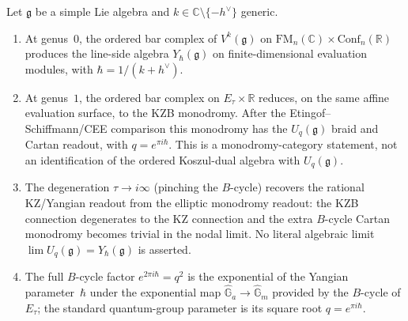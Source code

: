 \begin{theorem}
\ClaimStatusProvedHere
\label{thm:yangian-quantum-group}
Let $\mathfrak{g}$ be a simple Lie algebra and $k \in \mathbb{C}
\setminus \{-h^\vee\}$ generic.
\begin{enumerate}[label=\textup{(\roman*)}]
\item At genus~$0$, the ordered bar complex of $V^k(\mathfrak{g})$ on
 $\mathrm{FM}_n(\mathbb{C}) \times \mathrm{Conf}_n(\mathbb{R})$
 produces the line-side algebra $Y_\hbar(\mathfrak{g})$ on
 finite-dimensional evaluation modules, with
 $\hbar = 1/(k + h^\vee)$.

\item At genus~$1$, the ordered bar complex on
 $E_\tau \times \mathbb{R}$ reduces, on the same affine
 evaluation surface, to the KZB monodromy. After the
 Etingof--Schiffmann/CEE comparison this monodromy has the
 $U_q(\mathfrak{g})$ braid and Cartan readout, with
 $q = e^{\pi i \hbar}$. This is a monodromy-category statement, not
 an identification of the ordered Koszul-dual algebra with
 $U_q(\mathfrak g)$.

\item The degeneration $\tau \to i\infty$ \textup{(}pinching the
 $B$-cycle\textup{)} recovers the rational KZ/Yangian readout from
 the elliptic monodromy readout: the KZB connection degenerates to
 the KZ connection and the extra $B$-cycle Cartan monodromy becomes
 trivial in the nodal limit. No literal algebraic limit
 $\lim U_q(\mathfrak g)=Y_\hbar(\mathfrak g)$ is asserted.

\item The full $B$-cycle factor $e^{2\pi i \hbar} = q^2$ is the
 exponential of the Yangian parameter~$\hbar$ under the exponential map
 $\widehat{\mathbb{G}}_a \to \widehat{\mathbb{G}}_m$ provided by the
 $B$-cycle of $E_\tau$; the standard quantum-group parameter is its
 square root $q = e^{\pi i \hbar}$.
\end{enumerate}
\end{theorem}

